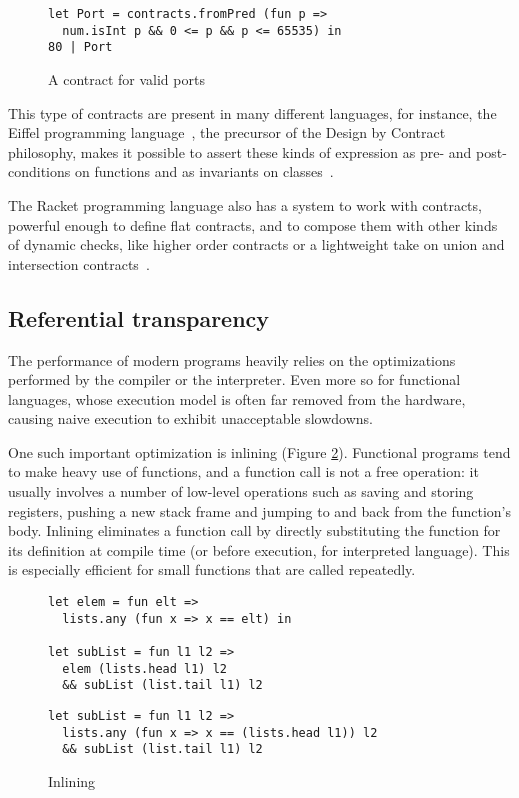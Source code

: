 \documentclass[sigplan,10pt,review,anonymous]{acmart}
\begin{document}
\begin{figure}[h]
  \begin{center}
\begin{lstlisting}[language=nickel]
let Port = contracts.fromPred (fun p =>
  num.isInt p && 0 <= p && p <= 65535) in
80 | Port
\end{lstlisting}
\end{center}
\caption{A contract for valid ports}
\label{fig:port-contract}
\end{figure}

This type of contracts are present in many different languages,
for instance, the Eiffel programming language~\cite{meyer1987eiffel}, the precursor
of the Design by Contract philosophy, makes it possible to assert
these kinds of expression as pre- and post-conditions on
functions and as invariants on classes~\cite{EiffelDesignByContract}.

The Racket programming language also has a system to work with
contracts, powerful enough to define flat contracts, and
to compose them with other kinds of dynamic checks,
like higher order contracts or a lightweight take on union
and intersection contracts~\cite{RacketContracts}.


\subsection{Referential transparency}
\label{sec:optimizations}

The performance of modern programs heavily relies on the optimizations performed
by the compiler or the interpreter. Even more so for functional languages, whose
execution model is often far removed from the hardware, causing naive execution
to exhibit unacceptable slowdowns.

One such important optimization is inlining (Figure
\ref{fig:optimizations-inlining-ex}). Functional programs tend to make heavy use
of functions, and a function call is not a free operation: it usually involves a
number of low-level operations such as saving and storing registers, pushing a new stack
frame and jumping to and back from the function's body. Inlining eliminates a
function call by directly substituting the function for its definition at
compile time (or before execution, for interpreted language). This is especially
efficient for small functions that are called repeatedly.

\begin{figure}[h]
  \begin{center}
\begin{lstlisting}[language=nickel,title={Source program}]
let elem = fun elt =>
  lists.any (fun x => x == elt) in

let subList = fun l1 l2 =>
  elem (lists.head l1) l2
  && subList (list.tail l1) l2
\end{lstlisting}
\begin{lstlisting}[language=nickel,title={Optimized program}]
let subList = fun l1 l2 =>
  lists.any (fun x => x == (lists.head l1)) l2
  && subList (list.tail l1) l2
\end{lstlisting}
  \end{center}
\caption{Inlining}
\label{fig:optimizations-inlining-ex}
\end{figure}
\end{document}
